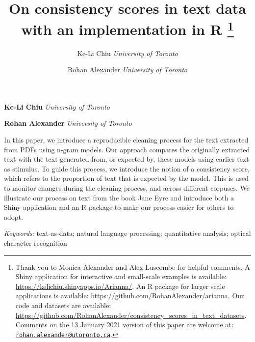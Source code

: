 \documentclass[11pt,]{article}
\title{On consistency scores in text data with an implementation in R \thanks{Thank you to Monica Alexander and Alex Luscombe for helpful comments. A Shiny application for interactive and small-scale examples is available: \url{https://kelichiu.shinyapps.io/Arianna/}. An R package for larger scale applications is available: \url{https://github.com/RohanAlexander/arianna}. Our code and datasets are available: \url{https://github.com/RohanAlexander/consistency_scores_in_text_datasets}. Comments on the 13 January 2021 version of this paper are welcome at: \href{mailto:rohan.alexander@utoronto.ca}{\nolinkurl{rohan.alexander@utoronto.ca}}.}  }
\author{\Large Ke-Li Chiu\vspace{0.05in} \newline\normalsize\emph{University of Toronto}   \and \Large Rohan Alexander\vspace{0.05in} \newline\normalsize\emph{University of Toronto}  }
\date{}
\newcommand*{\authorfont}{\fontfamily{phv}\selectfont}
\renewenvironment{abstract}
 {{%
    \setlength{\leftmargin}{0mm}
    \setlength{\rightmargin}{\leftmargin}%
  }%
  \relax}
 {\endlist}
\begin{document}
	
%

{%
\setlength{\parindent}{0pt}
\thispagestyle{plain}
{\fontsize{18}{20}\selectfont\raggedright 
\maketitle  %

}

{
   \vskip 13.5pt\relax \normalsize\fontsize{11}{12} 
\textbf{\authorfont Ke-Li Chiu} \hskip 15pt \emph{\small University of Toronto}   \par \textbf{\authorfont Rohan Alexander} \hskip 15pt \emph{\small University of Toronto}   

}

}








\begin{abstract}

    \hbox{\vrule height .2pt width 39.14pc}

    \vskip 8.5pt %

\noindent In this paper, we introduce a reproducible cleaning process for the text extracted from PDFs using n-gram models. Our approach compares the originally extracted text with the text generated from, or expected by, these models using earlier text as stimulus. To guide this process, we introduce the notion of a consistency score, which refers to the proportion of text that is expected by the model. This is used to monitor changes during the cleaning process, and across different corpuses. We illustrate our process on text from the book Jane Eyre and introduce both a Shiny application and an R package to make our process easier for others to adopt.


\vskip 8.5pt \noindent \emph{Keywords}: text-as-data; natural language processing; quantitative analysis; optical character recognition \par

    \hbox{\vrule height .2pt width 39.14pc}



\end{abstract}
\end{document}
